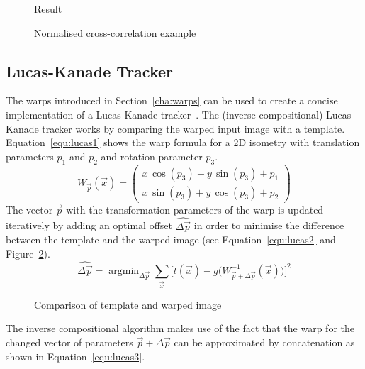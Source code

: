 \documentclass[12pt,a4paper,oneside,openright]{book}
\newcommand{\sct}[1]{Section~\ref{cha:#1}}
\newcommand{\equ}[1]{Equation~\ref{equ:#1}}
\newcommand{\fig}[1]{Figure~\ref{fig:#1}}
\begin{document}
\begin{CJK}{UTF8}{}
\begin{figure}[htbp]
\begin{center}
\begin{minipage}[c]{.42\textwidth}
\begin{center}
        Result
      \end{center}
    \end{minipage}
    \caption{Normalised cross-correlation example\label{fig:ncc}}
  \end{center}
\end{figure}

\subsection{Lucas-Kanade Tracker}
The warps introduced in \sct{warps} can be used to create a concise implementation of a Lucas-Kanade tracker~\citep{RefWorks:467,RefWorks:560,w2008}. The (inverse compositional) Lucas-Kanade tracker works by comparing the warped input image with a template. \equ{lucas1} shows the warp formula for a \ac{2D} isometry with translation parameters $p_1$ and $p_2$ and rotation parameter $p_3$.
\begin{equation}\label{equ:lucas1}
  W_{\vec{p}}(\vec{x})=
  \begin{pmatrix}
    x\,\cos(p_3)-y\,\sin(p_3)+p_1\\
    x\,\sin(p_3)+y\,\cos(p_3)+p_2
  \end{pmatrix}
\end{equation}
The vector $\vec{p}$ with the transformation parameters of the warp is updated iteratively by adding an optimal offset $\widehat{\Delta\vec{p}}$ in order to minimise the difference between the template and the warped image (see \equ{lucas2} and \fig{lucas1}).
\begin{equation}\label{equ:lucas2}
  \widehat{\Delta\vec{p}}=\mathop{\operatorname{argmin}}_{\Delta\vec{p}}\sum_{\vec{x}}\Big[t(\vec{x})-g\big(W_{\vec{p}+\Delta\vec{p}}^{-1}(\vec{x})\big)\Big]^2
\end{equation}
\begin{figure}[htbp]
  \begin{center}
    \caption{Comparison of template and warped image\label{fig:lucas1}}
  \end{center}
\end{figure}
The inverse compositional algorithm makes use of the fact that the warp for the changed vector of parameters $\vec{p}+\Delta\vec{p}$ can be approximated by concatenation as shown in \equ{lucas3}.
\begin{equation}\label{equ:lucas3}

\end{equation}
\end{CJK}
\end{document}
